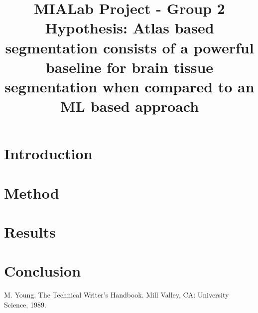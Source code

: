 \documentclass[conference]{IEEEtran}
\begin{document}
\title{MIALab Project - Group 2\\
{\footnotesize Hypothesis: Atlas based segmentation consists of a powerful baseline for brain tissue segmentation when compared to an ML based approach}
}

\author{
\and
{}
\and
{}
}

\maketitle

\begin{abstract}
\end{abstract}

\begin{IEEEkeywords}
\end{IEEEkeywords}

\section{Introduction}
\lipsum[1]

\section{Method}
\lipsum[2]


\section{Results}
\lipsum[3]


\section*{Conclusion}
\lipsum[4]


\begin{thebibliography}{00}
 M. Young, The Technical Writer's Handbook. Mill Valley, CA: University Science, 1989.
\end{thebibliography}
\end{document}
